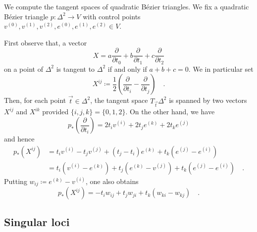 \documentclass[pdftex,a4paper,12pt]{scrartcl}
\theoremstyle{plain}
\theoremstyle{definition}
\theoremstyle{remark}
\begin{document}
We compute the tangent spaces of quadratic B\'ezier triangles.
We fix a quadratic B\'ezier triangle $p:\Delta^2\to V$ with control points $v^{(0)},v^{(1)},v^{(2)},e^{(0)},e^{(1)},e^{(2)}\in V$.

First observe that, a vector
\[
X=a\frac\partial{\partial t_0}+b\frac\partial{\partial t_1}+c\frac\partial{\partial t_2}
\]
on a point of $\Delta^2$ is tangent to $\Delta^2$ if and only if $a+b+c=0$.
We in particular set
\[
X^{ij}\coloneqq  \frac12\left(\frac\partial{\partial t_i}-\frac\partial{\partial t_j}\right)
\quad.
\]
Then, for each point $\vec t\in\Delta^2$, the tangent space $T_{\vec t}\Delta^2$ is spanned by two vectors $X^{ij}$ and $X^{ik}$ provided $\{i,j,k\}=\{0,1,2\}$.
On the other hand, we have
\[
p_\ast\left(\frac\partial{\partial t_i}\right)
= 2t_iv^{(i)}+2t_je^{(k)}+2t_ke^{(j)}
\]
and hence
\begin{equation}
\label{eq:dpX}
\begin{split}
p_\ast(X^{ij})
&= t_iv^{(i)}-t_jv^{(j)}+(t_j-t_i)e^{(k)}+t_k(e^{(j)}-e^{(i)}) \\
&= t_i(v^{(i)}-e^{(k)})+t_j(e^{(k)}-v^{(j)})+t_k(e^{(j)}-e^{(i)})
\quad.
\end{split}
\end{equation}
Putting $w_{ij}\coloneqq e^{(k)}-v^{(i)}$, one also obtains
\begin{equation}
\label{eq:dpX-inw}
p_\ast(X^{ij})
= -t_iw_{ij}+t_jw_{ji}+t_k(w_{ki}-w_{kj})
\quad.
\end{equation}

\subsection{Singular loci}
\end{document}

